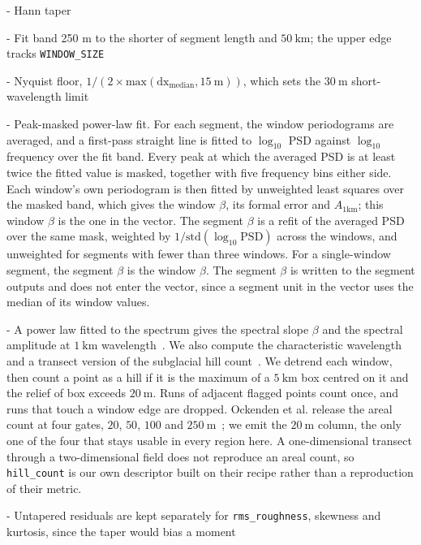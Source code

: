   - Hann taper

  - Fit band 250 m to the shorter of segment length and $50~\mathrm{km}$; the upper edge tracks \texttt{WINDOW\_SIZE}

  - Nyquist floor, $1/(2\times\mathrm{max}(\mathrm{dx}_{\mathrm{{median}}}, 15~\mathrm{m}))$, which sets the $30~\mathrm{m}$ short-wavelength limit

  - Peak-masked power-law fit. For each segment, the window periodograms are averaged, and a first-pass straight line is fitted to $\log_{10}$ PSD against $\log_{10}$ frequency
  over the fit band. Every peak at which the averaged PSD is at least twice the fitted value is masked, together with five frequency bins either side. Each window's own periodogram
  is then fitted by unweighted least squares over the masked band, which gives the window  $\beta$, its formal error and $A_{1\mathrm{km}}$; this window $\beta$ is the one in the
  vector. The segment $\beta$ is a refit of the averaged PSD over the same mask, weighted by $1/\mathrm{std}(\log_{10}\mathrm{PSD})$ across the windows, and unweighted for segments
  with fewer than three windows. For a single-window segment, the segment $\beta$ is the window $\beta$. The segment $\beta$ is written to the segment outputs and does not enter
  the vector, since a segment unit in the vector uses the median of its window values.

  - A power law fitted to the spectrum gives the spectral slope $\beta$ and the spectral
  amplitude at $1~\mathrm{km}$ wavelength~\cite{Hubbard_2000, Jordan_2017}. We also
  compute the characteristic wavelength~\cite{Li_2010, Rippin_2014} and a transect version of the subglacial hill count~\cite{Ockenden_2026}. We detrend each window, then count a point
  as a hill if it is the maximum of a $5~\mathrm{km}$ box centred on it and the relief of
  box exceeds $20~\mathrm{m}$. Runs of adjacent flagged points count once, and runs that
  touch a window edge are dropped. Ockenden et al. release the areal count at four gates,
  $20$, $50$, $100$ and $250~\mathrm{m}$~\cite{Ockenden_2025_data}; we emit the
  $20~\mathrm{m}$ column, the only one of the four that stays usable in every region here.
  A one-dimensional transect through a two-dimensional field does not reproduce an areal
  count, so \texttt{hill\_count} is our own descriptor built on their recipe rather than a
  reproduction of their metric.

  - Untapered residuals are kept separately for \texttt{rms\_roughness}, skewness and kurtosis, since the taper would bias a moment

